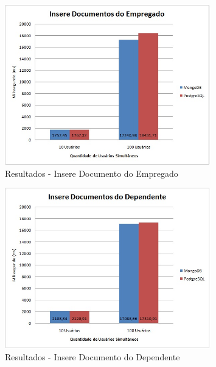 \begin{figure}[!htbp]
	\begin{center}
		\includegraphics[width=0.8\textwidth]{resultados/insere_doc_empregado}
	\end{center}
	\caption{Resultados - Insere Documento do Empregado}
	\label{fig:resultinseredocempregado}
\end{figure}


\begin{figure}[!htbp]
	\begin{center}
		\includegraphics[width=0.8\textwidth]{resultados/insere_doc_dependentes}
	\end{center}
	\caption{Resultados - Insere Documento do Dependente}
	\label{fig:resultinseredocdependente}
\end{figure}

